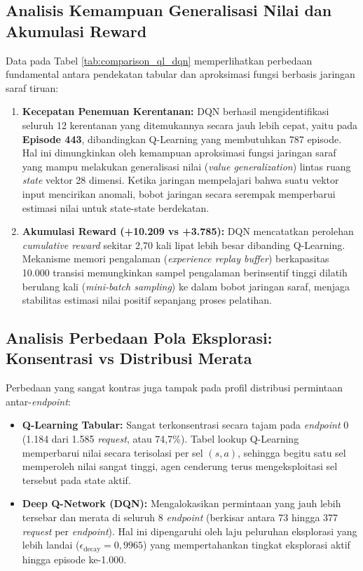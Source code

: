 \subsection{Analisis Kemampuan Generalisasi Nilai dan Akumulasi Reward}

Data pada Tabel \ref{tab:comparison_ql_dqn} memperlihatkan perbedaan fundamental antara pendekatan tabular dan aproksimasi fungsi berbasis jaringan saraf tiruan:
\begin{enumerate}
    \item \textbf{Kecepatan Penemuan Kerentanan:} DQN berhasil mengidentifikasi seluruh 12 kerentanan yang ditemukannya secara jauh lebih cepat, yaitu pada \textbf{Episode 443}, dibandingkan Q-Learning yang membutuhkan 787 episode. Hal ini dimungkinkan oleh kemampuan aproksimasi fungsi jaringan saraf yang mampu melakukan generalisasi nilai (\textit{value generalization}) lintas ruang \textit{state} vektor 28 dimensi. Ketika jaringan mempelajari bahwa suatu vektor input mencirikan anomali, bobot jaringan secara serempak memperbarui estimasi nilai untuk state-state berdekatan. 
    \item \textbf{Akumulasi Reward (+10.209 vs +3.785):} DQN mencatatkan perolehan \textit{cumulative reward} sekitar 2,70 kali lipat lebih besar dibanding Q-Learning. Mekanisme memori pengalaman (\textit{experience replay buffer}) berkapasitas 10.000 transisi memungkinkan sampel pengalaman berinsentif tinggi dilatih berulang kali (\textit{mini-batch sampling}) ke dalam bobot jaringan saraf, menjaga stabilitas estimasi nilai positif sepanjang proses pelatihan. 
\end{enumerate}

\subsection{Analisis Perbedaan Pola Eksplorasi: Konsentrasi vs Distribusi Merata}

Perbedaan yang sangat kontras juga tampak pada profil distribusi permintaan antar-\textit{endpoint}:
\begin{itemize}
    \item \textbf{Q-Learning Tabular:} Sangat terkonsentrasi secara tajam pada \textit{endpoint} 0 (1.184 dari 1.585 \textit{request}, atau 74,7\%). Tabel lookup Q-Learning memperbarui nilai secara terisolasi per sel $(s, a)$, sehingga begitu satu sel memperoleh nilai sangat tinggi, agen cenderung terus mengeksploitasi sel tersebut pada state aktif. 
    \item \textbf{Deep Q-Network (DQN):} Mengalokasikan permintaan yang jauh lebih tersebar dan merata di seluruh 8 \textit{endpoint} (berkisar antara 73 hingga 377 \textit{request} per \textit{endpoint}). Hal ini dipengaruhi oleh laju peluruhan eksplorasi yang lebih landai ($\epsilon_{\text{decay}} = 0,9965$) yang mempertahankan tingkat eksplorasi aktif hingga episode ke-1.000. 
\end{itemize}

